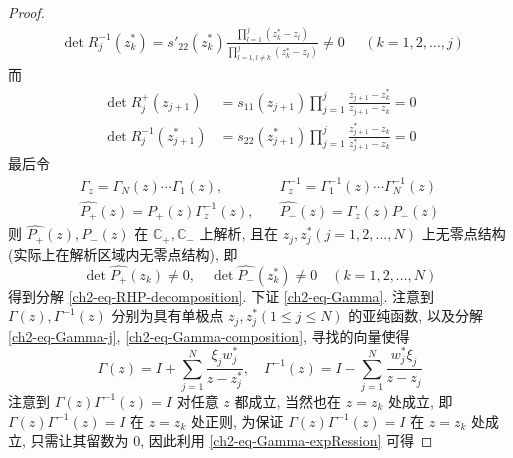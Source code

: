 \begin{proof}
\begin{equation}
\begin{aligned}
            \det R_{j}^{-1}(z_{k}^{*}) = s'_{22}(z_{k}^{*}) \frac{\prod_{l = 1}^{j}(z_{k}^{*} - z_{l})}{\prod_{l = 1, l \neq k }^{j}(z_{k}^{*} - z_{l})} \neq 0
        \end{aligned}  \quad (k = 1, 2, \dots, j)
    \end{equation}
    而
    \begin{equation}
        \begin{aligned}
            \det R_{j}^{+}(z_{j+1})      & = s_{11}(z_{j+1}) \prod_{j = 1}^{j} \frac{z_{j+1} - z_{k}^{*}}{z_{j+1} - z_{k}} = 0         \\
            \det R_{j}^{-1}(z_{j+1}^{*}) & = s_{22}(z_{j+1}^{*}) \prod_{j = 1}^{j} \frac{z_{j+1}^{*} - z_{k}}{z_{j+1}^{*} - z_{k}} = 0
        \end{aligned}
    \end{equation}
    最后令
    \begin{equation}
        \begin{aligned}
            \Gamma_{z} = \Gamma_{N}(z) \cdots \Gamma_{1}(z), & \quad \Gamma_{z}^{-1} = \Gamma_{1}^{-1}(z) \cdots \Gamma_{N}^{-1}(z) \label{ch2-eq-Gamma-composition} \\
            \hat{P_{+}}(z) = P_{+}(z) \Gamma_{z}^{-1}(z),    & \quad \hat{P_{-}}(z) = \Gamma_{z}(z) P_{-}(z)
        \end{aligned}
    \end{equation}
    则 $ \hat{P_{+}}(z), \hat{P_{-}}(z) $ 在 $ \mathbb{C_{+}}, \mathbb{C_{-}} $ 上解析, 且在 $ z_{j}, z_{j}^{*} (j = 1,2, \dots, N) $ 上无零点结构 (实际上在解析区域内无零点结构), 即
    \begin{equation}
        \det \hat{P_{+}}(z_{k}) \neq 0, \quad \det \hat{P_{-}}(z_{k}^{*}) \neq 0 \quad (k = 1,2, \dots, N)
    \end{equation}
    得到分解 \eqref{ch2-eq-RHP-decomposition}. 下证 \eqref{ch2-eq-Gamma}. 注意到 $ \Gamma(z), \Gamma^{-1}(z) $ 分别为具有单极点 $ z_{j}, z_{j}^{*} (1 \leq j \leq N)$ 的亚纯函数, 以及分解 \eqref{ch2-eq-Gamma-j}, \eqref{ch2-eq-Gamma-composition}, 寻找的向量使得
    \begin{equation}
        \Gamma(z) = I + \sum_{j=1}^{N} \frac{\xi_{j}w_{j}^{*}}{z-z_{j}^{*}}, \quad \Gamma^{-1}(z) = I - \sum_{j=1}^{N} \frac{w_{j}^{*}\xi_{j}}{z - z_{j}} \label{ch2-eq-Gamma-expRession}
    \end{equation}
    注意到 $ \Gamma(z) \Gamma^{-1}(z) = I $ 对任意 $ z $ 都成立, 当然也在 $ z = z_{k} $ 处成立, 即 $ \Gamma(z) \Gamma^{-1}(z) = I $ 在 $ z = z_{k} $ 处正则, 为保证 $ \Gamma(z) \Gamma^{-1}(z) = I $ 在 $ z = z_{k} $ 处成立, 只需让其留数为 $ 0 $, 因此利用 \eqref{ch2-eq-Gamma-expRession} 可得

\end{proof}
